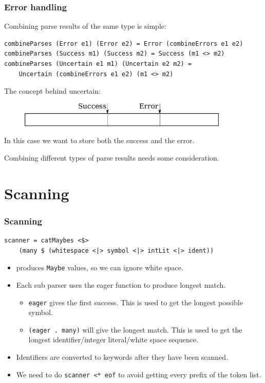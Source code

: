 \documentclass{beamer}
\begin{document}
\begin{frame}[fragile]

\frametitle{Error handling}

Combining parse results of the same type is simple:

\begin{lstlisting}
combineParses (Error e1) (Error e2) = Error (combineErrors e1 e2)
combineParses (Success m1) (Success m2) = Success (m1 <> m2)
combineParses (Uncertain e1 m1) (Uncertain e2 m2) =
    Uncertain (combineErrors e1 e2) (m1 <> m2)
\end{lstlisting}

The concept behind uncertain:
\begin{figure}
\includegraphics[width=10cm]{drawing}
\end{figure}
In this case we want to store both the success and the error.

Combining different types of parse results needs some consideration.


\end{frame}

\section{Scanning}
\begin{frame}[fragile]
\frametitle{Scanning}

\begin{lstlisting}
scanner = catMaybes <$> 
    (many $ (whitespace <|> symbol <|> intLit <|> ident)) 
\end{lstlisting}

\begin{itemize}
\item produces \lstinline{Maybe} values, so we can ignore white space.
\item Each sub parser uses the eager function to produce longest match.
    \begin{itemize}
    \item \lstinline{eager} gives the first success. This is used to get the longest possible symbol.
    \item \lstinline{(eager . many)} will give the longest match. This is used to get the longest identifier/integer literal/white space sequence.
    \end{itemize}
\item Identifiers are converted to keywords after they have been scanned.
\item We need to do \lstinline{scanner <* eof} to avoid getting every prefix of the token list.
\end{itemize}
\end{frame}
\end{document}

